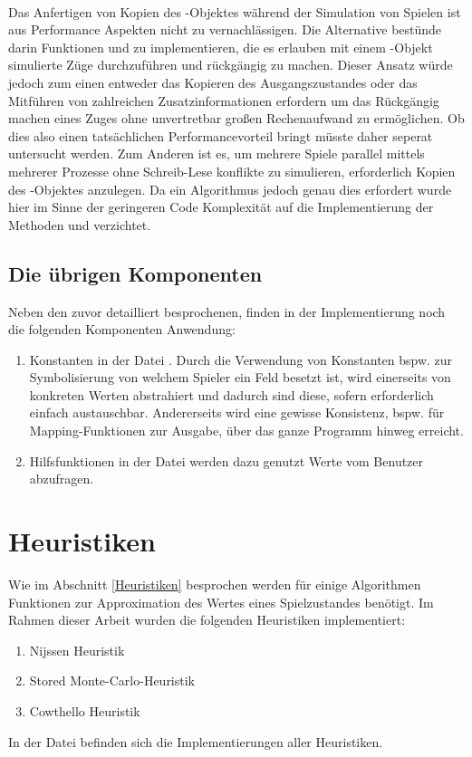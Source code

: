 \begin{enumerate}
\\Das Anfertigen von Kopien des -Objektes während der Simulation von Spielen ist aus Performance Aspekten nicht zu vernachlässigen. Die Alternative bestünde darin Funktionen  und  zu implementieren, die es erlauben mit einem -Objekt simulierte Züge durchzuführen und rückgängig zu machen. Dieser Ansatz würde jedoch zum einen entweder das Kopieren des Ausgangszustandes oder das Mitführen von zahlreichen Zusatzinformationen erfordern um das Rückgängig machen eines Zuges ohne unvertretbar großen Rechenaufwand zu ermöglichen. Ob dies also einen tatsächlichen Performancevorteil bringt müsste daher seperat untersucht werden. Zum Anderen ist es, um mehrere Spiele parallel mittels mehrerer Prozesse ohne Schreib-Lese konflikte zu simulieren, erforderlich Kopien des -Objektes anzulegen. Da ein Algorithmus jedoch genau dies erfordert wurde hier im Sinne der geringeren Code Komplexität auf die Implementierung der Methoden  und  verzichtet.
\end{enumerate}
\subsection{Die übrigen Komponenten}
Neben den zuvor detailliert besprochenen, finden in der Implementierung noch die folgenden Komponenten Anwendung: 
\begin{enumerate}
\item Konstanten in der Datei . Durch die Verwendung von Konstanten bspw. zur Symbolisierung von welchem Spieler ein Feld besetzt ist, wird einerseits von konkreten Werten abstrahiert und dadurch sind diese, sofern erforderlich einfach austauschbar. Andererseits wird eine gewisse Konsistenz, bspw. für Mapping-Funktionen zur Ausgabe, über das ganze Programm hinweg erreicht.
\item Hilfsfunktionen in der Datei  werden dazu genutzt Werte vom Benutzer abzufragen.
\end{enumerate}
\section{Heuristiken}
\label{heuristic}
Wie im Abschnitt \ref{Heuristiken} besprochen werden für einige Algorithmen Funktionen zur Approximation des Wertes eines Spielzustandes benötigt. Im Rahmen dieser Arbeit wurden die folgenden Heuristiken implementiert:
\begin{enumerate}
\item Nijssen Heuristik
\item Stored Monte-Carlo-Heuristik
\item Cowthello Heuristik
\end{enumerate}
In der Datei  befinden sich die Implementierungen aller Heuristiken.

